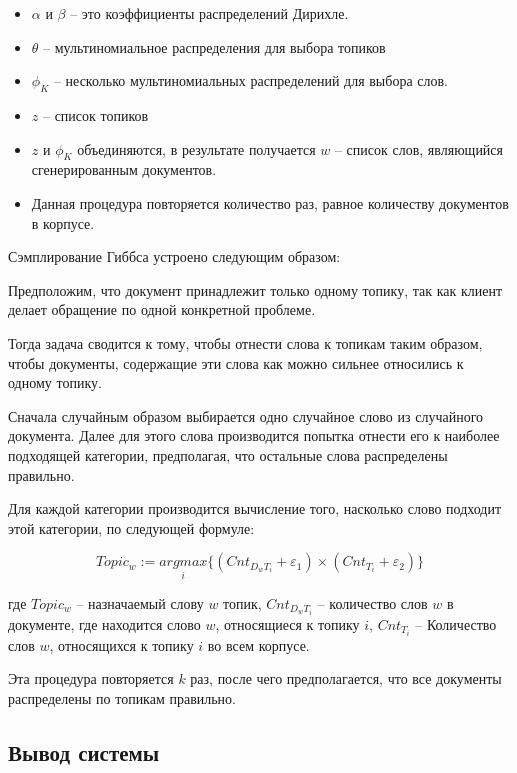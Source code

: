 \documentclass[a4paper,12pt,preview]{report} %
\begin{document}
	\begin{itemize}
		\item $ \alpha $ и $ \beta $ -- это коэффициенты распределений Дирихле.
		\item $ \theta $ -- мультиномиальное распределения для выбора топиков
		\item $ \phi_K $ -- несколько мультиномиальных распределений для выбора слов. 
		\item $z$ -- список топиков
		\item $z$ и $\phi_K$ объединяются, в результате получается $w$ -- список слов, являющийся сгенерированным документов.
		\item Данная процедура повторяется количество раз, равное количеству документов в корпусе.
 	\end{itemize}
	 
	 Сэмплирование Гиббса устроено следующим образом:
	 
	 Предположим, что документ принадлежит только одному топику, так как клиент делает обращение по одной конкретной проблеме.
	 
	 Тогда задача сводится к тому, чтобы отнести слова к топикам таким образом, чтобы документы, содержащие эти слова как можно сильнее относились к одному топику.
	 
	 Сначала случайным образом выбирается одно случайное слово из случайного документа. Далее для этого слова производится попытка отнести его к наиболее подходящей категории, предполагая, что остальные слова распределены правильно.
	 
	 Для каждой категории производится вычисление того, насколько слово подходит этой категории, по следующей формуле:
	 
	 \begin{equation}
	 	Topic_w := \underset{i}{argmax} \{(Cnt_{D_wT_i} + \varepsilon_1) \times (Cnt_{T_i} + \varepsilon_2)\}
	 \end{equation}
	
	где $Topic_w$ -- назначаемый слову $w$ топик, $Cnt_{D_wT_i}$ -- количество слов $w$ в документе, где находится слово $w$, относящиеся к топику $i$, $Cnt_{T_i}$ -- Количество слов $w$, относящихся к топику $i$ во всем корпусе. 
	
	Эта процедура повторяется $k$ раз, после чего предполагается, что все документы распределены по топикам правильно.
	
	\subsection{Вывод системы}
	
\end{document}
